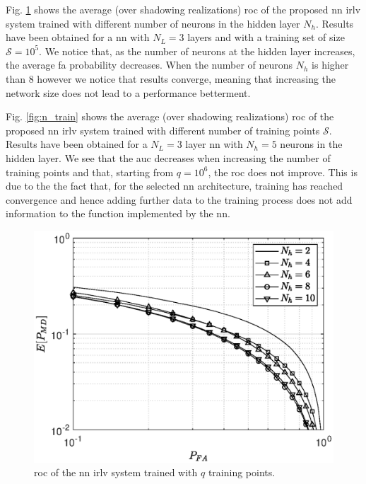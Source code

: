 \documentclass[conference,final]{IEEEtran}
\begin{document}

Fig. \ref{fig:n_neur} shows the average (over shadowing realizations) \ac{roc} of the proposed \ac{nn} \ac{irlv} system  trained with different number of neurons in the hidden layer $N_h$. Results have been obtained for a \ac{nn} with $N_L=3$ layers and with a training set of size $\mathcal{S}= 10^5$. We notice that, as the number of neurons at the hidden layer increases, the average \ac{fa} probability decreases. When the number of neurons $N_h$ is higher than $8$ however we notice that results converge, meaning that increasing the network size does not lead to a performance betterment. 

Fig. \ref{fig:n_train} shows the average (over shadowing realizations) \ac{roc} of the proposed \ac{nn} \ac{irlv} system  trained with different number of training points $\mathcal{S}$. Results have been obtained for a $N_L=3$ layer \ac{nn} with $N_h=5$ neurons in the hidden layer. We see that the \ac{auc} decreases when increasing the number of training points and that, starting from $q=10^6$, the \ac{roc} does not improve. This is due to the the fact that, for the selected \ac{nn} architecture, training has reached convergence and hence adding further data to the training process does not add information to the function implemented by the \ac{nn}. 

\begin{figure}[t]
    \centering
    \includegraphics[width=0.9\columnwidth]{res_avg_nNeur_1e5.eps}
    \caption{\ac{roc} of the \ac{nn} \ac{irlv} system trained with $q$ training points.}
    \label{fig:n_neur}
\end{figure}
\end{document}
